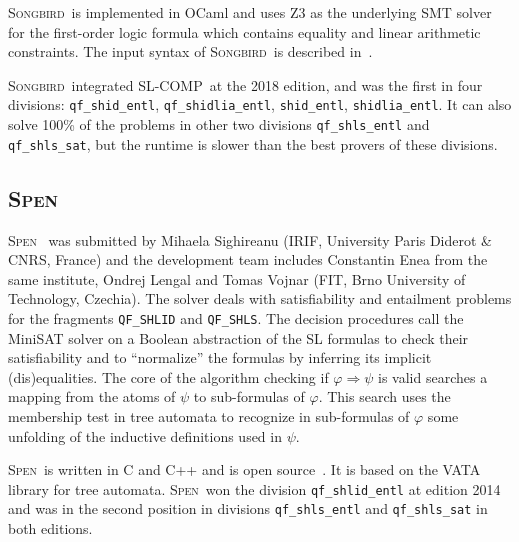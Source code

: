 \documentclass[orivec]{llncs}
\newcommand{\limp}{\Rightarrow}
\newcommand{\SG}{\textsc{Songbird}}
\newcommand{\SPEN}{\textsc{Spen}}
\newcommand{\slcomp}{\textsf{SL-COMP}}
\begin{document}
\SG\ is implemented in OCaml and uses Z3 as the underlying SMT solver for the first-order logic formula which contains equality and linear arithmetic constraints. 
The input syntax of \SG\ is described in~\cite{SBsite}.

\SG\ integrated \slcomp\ at the 2018 edition, and was the first in four divisions:
\verb|qf_shid_entl|, \verb|qf_shidlia_entl|, \verb|shid_entl|, \verb|shidlia_entl|.
It can also solve 100\%
of the problems in other two divisions \verb|qf_shls_entl| and \verb|qf_shls_sat|, but the runtime is slower than the best provers of these divisions.

\subsection{\SPEN}

\SPEN~\cite{EneaLSV14,SPENsite} 
was submitted by Mihaela Sighireanu (IRIF, University Paris Diderot \& CNRS, France)
and the development team includes 
Constantin Enea from the same institute,
Ondrej Lengal and Tomas Vojnar (FIT, Brno University of Technology, Czechia).
The solver deals with satisfiability and entailment problems for the fragments 
\verb|QF_SHLID| and \verb|QF_SHLS|.
The decision procedures call the MiniSAT solver on a Boolean abstraction of the SL formulas to check their satisfiability and to ``normalize'' the formulas by inferring its implicit (dis)equalities. %
The core of the algorithm checking if $\varphi\limp\psi$ is valid searches a mapping from the atoms of $\psi$ to sub-formulas of $\varphi$.
This search uses the membership test in tree automata to recognize in sub-formulas of $\varphi$ some unfolding of the inductive definitions used in $\psi$.

\SPEN\ is written in C and C++ and is open source~\cite{SPENsite}.
It is based on the VATA library for tree automata.
\SPEN\ won the division \verb|qf_shlid_entl| at edition 2014 and was in the second
position in divisions \verb|qf_shls_entl| and \verb|qf_shls_sat| in both editions.

%
%
\end{document}
